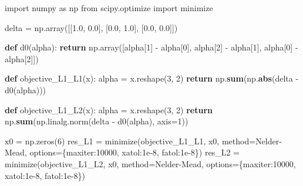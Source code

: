 \documentclass[
  11pt,
]{article}
\newenvironment{Shaded}{\begin{snugshade}}{\end{snugshade}}
\newcommand{\BuiltInTok}[1]{\textcolor[rgb]{0.39,0.29,0.61}{\textbf{#1}}}
\newcommand{\ControlFlowTok}[1]{\textcolor[rgb]{0.12,0.11,0.11}{\textbf{#1}}}
\newcommand{\DecValTok}[1]{\textcolor[rgb]{0.69,0.50,0.00}{#1}}
\newcommand{\FloatTok}[1]{\textcolor[rgb]{0.69,0.50,0.00}{#1}}
\newcommand{\ImportTok}[1]{\textcolor[rgb]{1.00,0.33,0.00}{#1}}
\newcommand{\KeywordTok}[1]{\textcolor[rgb]{0.12,0.11,0.11}{\textbf{#1}}}
\newcommand{\NormalTok}[1]{\textcolor[rgb]{0.12,0.11,0.11}{#1}}
\newcommand{\OperatorTok}[1]{\textcolor[rgb]{0.12,0.11,0.11}{#1}}
\newcommand{\StringTok}[1]{\textcolor[rgb]{0.75,0.01,0.01}{#1}}
\begin{document}
\begin{Shaded}
\begin{Highlighting}[]
\ImportTok{import}\NormalTok{ numpy }\ImportTok{as}\NormalTok{ np}
\ImportTok{from}\NormalTok{ scipy.optimize }\ImportTok{import}\NormalTok{ minimize}

\NormalTok{delta }\OperatorTok{=}\NormalTok{ np.array([[}\FloatTok{1.0}\NormalTok{, }\FloatTok{0.0}\NormalTok{], [}\FloatTok{0.0}\NormalTok{, }\FloatTok{1.0}\NormalTok{], [}\FloatTok{0.0}\NormalTok{, }\FloatTok{0.0}\NormalTok{]])}

\KeywordTok{def}\NormalTok{ d0(alpha):}
    \ControlFlowTok{return}\NormalTok{ np.array([alpha[}\DecValTok{1}\NormalTok{] }\OperatorTok{{-}}\NormalTok{ alpha[}\DecValTok{0}\NormalTok{], alpha[}\DecValTok{2}\NormalTok{] }\OperatorTok{{-}}\NormalTok{ alpha[}\DecValTok{1}\NormalTok{], alpha[}\DecValTok{0}\NormalTok{] }\OperatorTok{{-}}\NormalTok{ alpha[}\DecValTok{2}\NormalTok{]])}

\KeywordTok{def}\NormalTok{ objective\_L1\_L1(x):}
\NormalTok{    alpha }\OperatorTok{=}\NormalTok{ x.reshape(}\DecValTok{3}\NormalTok{, }\DecValTok{2}\NormalTok{)}
    \ControlFlowTok{return}\NormalTok{ np.}\BuiltInTok{sum}\NormalTok{(np.}\BuiltInTok{abs}\NormalTok{(delta }\OperatorTok{{-}}\NormalTok{ d0(alpha)))}

\KeywordTok{def}\NormalTok{ objective\_L1\_L2(x):}
\NormalTok{    alpha }\OperatorTok{=}\NormalTok{ x.reshape(}\DecValTok{3}\NormalTok{, }\DecValTok{2}\NormalTok{)}
    \ControlFlowTok{return}\NormalTok{ np.}\BuiltInTok{sum}\NormalTok{(np.linalg.norm(delta }\OperatorTok{{-}}\NormalTok{ d0(alpha), axis}\OperatorTok{=}\DecValTok{1}\NormalTok{))}

\NormalTok{x0 }\OperatorTok{=}\NormalTok{ np.zeros(}\DecValTok{6}\NormalTok{)}
\NormalTok{res\_L1 }\OperatorTok{=}\NormalTok{ minimize(objective\_L1\_L1, x0, method}\OperatorTok{=}\StringTok{\textquotesingle{}Nelder{-}Mead\textquotesingle{}}\NormalTok{, options}\OperatorTok{=}\NormalTok{\{}\StringTok{\textquotesingle{}maxiter\textquotesingle{}}\NormalTok{:}\DecValTok{10000}\NormalTok{, }\StringTok{\textquotesingle{}xatol\textquotesingle{}}\NormalTok{:}\FloatTok{1e{-}8}\NormalTok{, }\StringTok{\textquotesingle{}fatol\textquotesingle{}}\NormalTok{:}\FloatTok{1e{-}8}\NormalTok{\})}
\NormalTok{res\_L2 }\OperatorTok{=}\NormalTok{ minimize(objective\_L1\_L2, x0, method}\OperatorTok{=}\StringTok{\textquotesingle{}Nelder{-}Mead\textquotesingle{}}\NormalTok{, options}\OperatorTok{=}\NormalTok{\{}\StringTok{\textquotesingle{}maxiter\textquotesingle{}}\NormalTok{:}\DecValTok{10000}\NormalTok{, }\StringTok{\textquotesingle{}xatol\textquotesingle{}}\NormalTok{:}\FloatTok{1e{-}8}\NormalTok{, }\StringTok{\textquotesingle{}fatol\textquotesingle{}}\NormalTok{:}\FloatTok{1e{-}8}\NormalTok{\})}


\end{Highlighting}
\end{Shaded}
\end{document}
